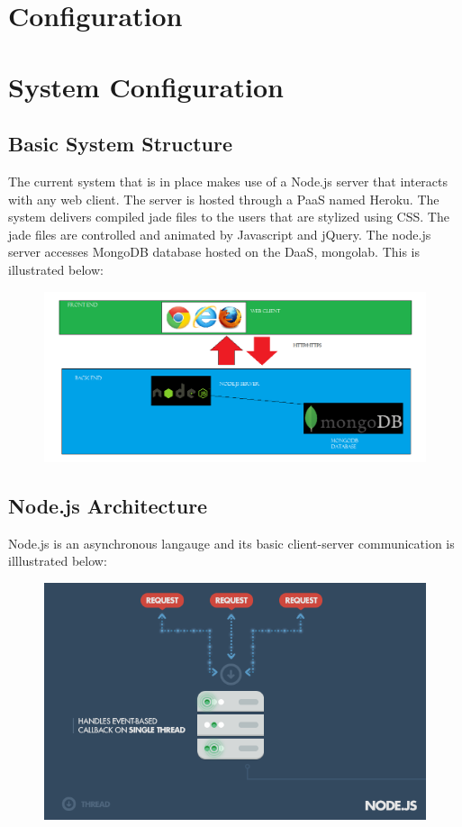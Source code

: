 \documentclass[14pt, a4paper]{article}
\begin{document}
\newpage

\section{Configuration}
\section{System Configuration}
\subsection{Basic System Structure}
The current system that is in place makes use of a Node.js server that interacts with any web client. The server is hosted through a PaaS named Heroku. The system delivers compiled jade files to the users that are stylized using CSS. The jade files are controlled and animated by Javascript and jQuery. The node.js server accesses MongoDB database hosted on the DaaS, mongolab. This is illustrated below:
\begin{figure}[h!]
\includegraphics[width=1.0\textwidth]{Graphics/Screenshots/infrastructure}
\end{figure}
\newpage
\subsection{Node.js Architecture}
Node.js is an asynchronous langauge and its basic client-server communication is illlustrated below:
\begin{figure}[h!]
\includegraphics[width=1.0\textwidth]{Graphics/Screenshots/nodejsinfrastructure}
\end{figure}
\end{document}
